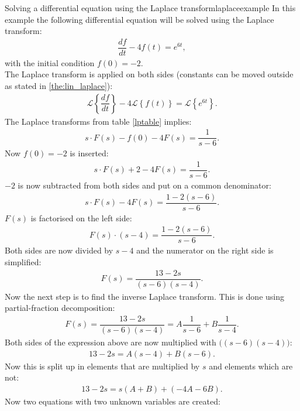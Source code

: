 \begin{example}{Solving a differential equation using the Laplace transform}{laplaceexample}
In this example the following differential equation will be solved using the Laplace transform:
\begin{align}
\dfrac{df}{dt}-4f(t)=e^{6t}, \label{eq:lap_ex}
\end{align} 
with the initial condition $f(0)=-2$.
\\
The Laplace transform is applied on both sides (constants can be moved outside as stated in \cref{the:lin_laplace}):
\begin{align*}
\mathcal{L} \left\{\dfrac{df}{dt} \right\}-4 
\mathcal{L} \left\{f(t) \right\} = 
\mathcal{L} \left\{e^{6t} \right\}.
\end{align*}
The Laplace transforms from table \ref{lptable} implies:
\begin{align*}
s \cdot F(s) - f(0) - 4F(s)= \dfrac{1}{s-6}.
\end{align*}
Now $f(0)=-2$ is inserted:
\begin{align*}
s \cdot F(s) + 2 - 4F(s)= \dfrac{1}{s-6}.
\end{align*}
$-2$ is now subtracted from both sides and put on a common denominator:
\begin{align*}
s \cdot F(s) - 4F(s)= \dfrac{1-2(s-6)}{s-6}.
\end{align*}
$F(s)$ is factorised on the left side:
\begin{align*}
F(s) \cdot (s-4) = \dfrac{1-2(s-6)}{s-6}.
\end{align*}
Both sides are now divided by $s-4$ and the numerator on the right side is simplified:
\begin{align*}
F(s) = \dfrac{13-2s}{(s-6)(s-4)}.
\end{align*}
Now the next step is to find the inverse Laplace transform. This is done using partial-fraction decomposition: \cite[p.~537]{calc}
\begin{align}
F(s) = \dfrac{13-2s}{(s-6)(s-4)} = A \dfrac{1}{s-6} + B \dfrac{1}{s-4}.
\label{par_dec}
\end{align}
Both sides of the expression above are now multiplied with $\big((s-6)(s-4)\big)$:
\begin{align*}
13-2s = A(s-4) + B(s-6).
\end{align*}
Now this is split up in elements that are multiplied by $s$ and elements which are not:
\begin{align*}
13-2s = s(A+B)+(-4A-6B).
\end{align*}
Now two equations with two unknown variables are created:

\end{example}
